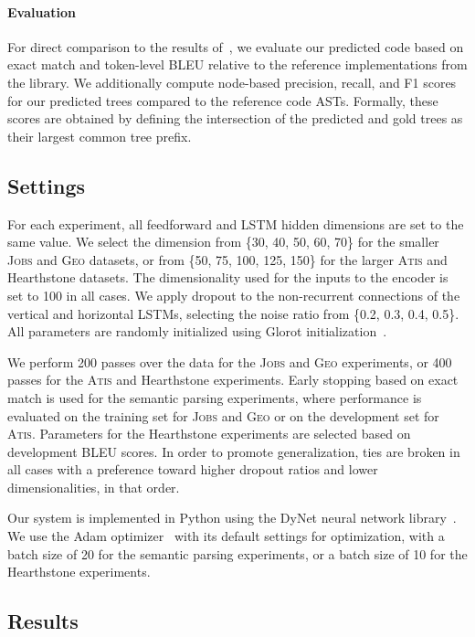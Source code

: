 \documentclass[11pt,a4paper]{article}
\newcommand{\Geo}{\textsc{Geo}\xspace}
\newcommand{\Jobs}{\textsc{Jobs}\xspace}
\newcommand{\Atis}{\textsc{Atis}\xspace}
\newcommand{\HS}{{\sc Hearthstone}\xspace}
\begin{document}
\paragraph{Evaluation}

For direct comparison to the results of~\citet{Ling16Code}, we evaluate our predicted code based on exact match and token-level BLEU relative to the reference implementations from the library. We additionally compute node-based precision, recall, and F1 scores for our predicted trees compared to the reference code ASTs. Formally, these scores are obtained by defining the intersection of the predicted and gold trees as their largest common tree prefix. 

\subsection{Settings} For each experiment, all feedforward and LSTM hidden dimensions are set to the same value. We select the dimension from \{30, 40, 50, 60, 70\} for the smaller \Jobs and \Geo datasets, or from \{50, 75, 100, 125, 150\} for the larger \Atis and \HS datasets. The dimensionality used for the inputs to the encoder is set to 100 in all cases. We apply dropout to the non-recurrent connections of the vertical and horizontal LSTMs, selecting the noise ratio from \{0.2, 0.3, 0.4, 0.5\}. All parameters are randomly initialized using Glorot initialization~\citep{Glorot10Understanding}.

We perform 200 passes over the data for the \Jobs and \Geo experiments, or 400 passes for the \Atis and \HS experiments. Early stopping based on exact match is used for the semantic parsing experiments, where performance is evaluated on the training set for \Jobs and \Geo or on the development set for \Atis. Parameters for the \HS experiments are selected based on development BLEU scores. In order to promote generalization, ties are broken in all cases with a preference toward higher dropout ratios and lower dimensionalities, in that order.

Our system is implemented in Python using the DyNet neural network library~\citep{Neubig17Dynet}. We use the Adam optimizer~\citep{Kingma14Adam} with its default settings for optimization, with a batch size of 20 for the semantic parsing experiments, or a batch size of 10 for the \HS experiments.

\subsection{Results}
\end{document}
